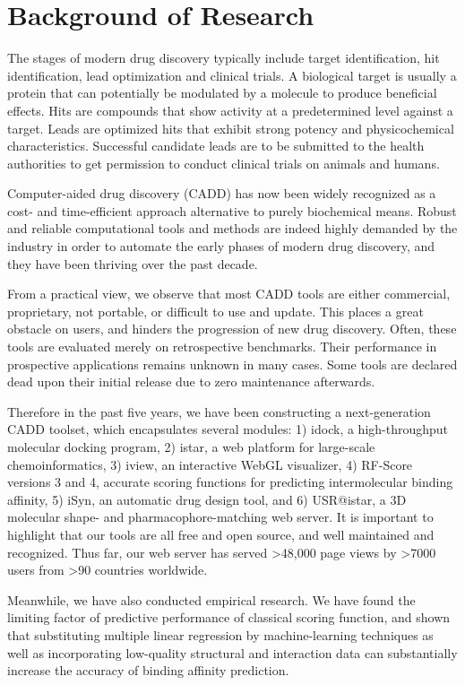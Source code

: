 \documentclass[a4paper,12pt]{article}
\begin{document}
\section*{Background of Research}

The stages of modern drug discovery typically include target identification, hit identification, lead optimization and clinical trials. A biological target is usually a protein that can potentially be modulated by a molecule to produce beneficial effects. Hits are compounds that show activity at a predetermined level against a target. Leads are optimized hits that exhibit strong potency and physicochemical characteristics. Successful candidate leads are to be submitted to the health authorities to get permission to conduct clinical trials on animals and humans.

Computer-aided drug discovery (CADD) has now been widely recognized as a cost- and time-efficient approach alternative to purely biochemical means. Robust and reliable computational tools and methods are indeed highly demanded by the industry in order to automate the early phases of modern drug discovery, and they have been thriving over the past decade.

From a practical view, we observe that most CADD tools are either commercial, proprietary, not portable, or difficult to use and update. This places a great obstacle on users, and hinders the progression of new drug discovery. Often, these tools are evaluated merely on retrospective benchmarks. Their performance in prospective applications remains unknown in many cases. Some tools are declared dead upon their initial release due to zero maintenance afterwards.

Therefore in the past five years, we have been constructing a next-generation CADD toolset, which encapsulates several modules: 1) idock, a high-throughput molecular docking program, 2) istar, a web platform for large-scale chemoinformatics, 3) iview, an interactive WebGL visualizer, 4) RF-Score versions 3 and 4, accurate scoring functions for predicting intermolecular binding affinity, 5) iSyn, an automatic drug design tool, and 6) USR@istar, a 3D molecular shape- and pharmacophore-matching web server. It is important to highlight that our tools are all free and open source, and well maintained and recognized. Thus far, our web server has served \textgreater48,000 page views by \textgreater7000 users from \textgreater90 countries worldwide.

Meanwhile, we have also conducted empirical research. We have found the limiting factor of predictive performance of classical scoring function, and shown that substituting multiple linear regression by machine-learning techniques as well as incorporating low-quality structural and interaction data can substantially increase the accuracy of binding affinity prediction.
\end{document}
